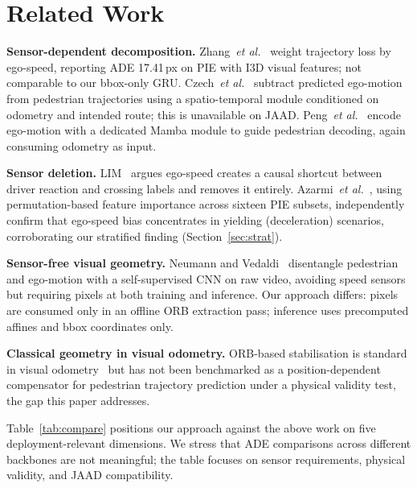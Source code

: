 \documentclass[conference]{IEEEtran}
\begin{document}
\section{Related Work}
\label{sec:related}

\textbf{Sensor-dependent decomposition.}
Zhang~\textit{et al.}~\cite{zhang2024decouple} weight trajectory loss by ego-speed, reporting ADE 17.41\,px on PIE with I3D visual features; not comparable to our bbox-only GRU.
Czech~\textit{et al.}~\cite{czech2023behavior} subtract predicted ego-motion from pedestrian trajectories using a spatio-temporal module conditioned on odometry and intended route; this is unavailable on JAAD.
Peng~\textit{et al.}~\cite{peng2026trajmamba} encode ego-motion with a dedicated Mamba module to guide pedestrian decoding, again consuming odometry as input.

\textbf{Sensor deletion.}
LIM~\cite{lim2025tits} argues ego-speed creates a causal shortcut between driver reaction and crossing labels and removes it entirely.
Azarmi~\textit{et al.}~\cite{azarmi2024feature}, using permutation-based feature importance across sixteen PIE subsets, independently confirm that ego-speed bias concentrates in yielding (deceleration) scenarios, corroborating our stratified finding (Section~\ref{sec:strat}).

\textbf{Sensor-free visual geometry.}
Neumann and Vedaldi~\cite{neumann2021pedestrian} disentangle pedestrian and ego-motion with a self-supervised CNN on raw video, avoiding speed sensors but requiring pixels at both training and inference.
Our approach differs: pixels are consumed only in an offline ORB extraction pass; inference uses precomputed affines and bbox coordinates only.

\textbf{Classical geometry in visual odometry.}
ORB-based stabilisation is standard in visual odometry~\cite{rublee2011orb} but has not been benchmarked as a position-dependent compensator for pedestrian trajectory prediction under a physical validity test, the gap this paper addresses.

Table~\ref{tab:compare} positions our approach against the above work on five deployment-relevant dimensions.
We stress that ADE comparisons across different backbones are not meaningful; the table focuses on sensor requirements, physical validity, and JAAD compatibility.
\end{document}
